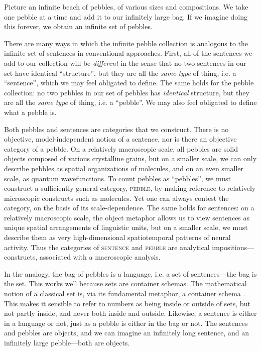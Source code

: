 Picture an infinite beach of pebbles, of various sizes and compositions. We take one pebble at a time and add it to our infinitely large bag. If we imagine doing this forever, we obtain an infinite set of pebbles. 

  There are many ways in which the infinite pebble collection is analogous to the infinite set of sentences in conventional approaches. First, all of the sentences we add to our collection will be \textit{different} in the sense that no two sentences in our set have identical “structure”, but they are all the \textit{same type} of thing, i.e. a “sentence”, which we may feel obligated to define. The same holds for the pebble collection: no two pebbles in our set of pebbles has \textit{identical} structure, but they are all the \textit{same type} of thing, i.e. a “pebble”. We may also feel obligated to define what a pebble is.

  Both pebbles and sentences are categories that we construct. There is no objective, model-independent notion of a sentence, nor is there an objective category of a pebble. On a relatively macroscopic scale, all pebbles are solid objects composed of various crystalline grains, but on a smaller scale, we can only describe pebbles as spatial organizations of molecules, and on an even smaller scale, as quantum wavefunctions. To count pebbles as “pebbles”, we must construct a sufficiently general category, \textsc{pebble}, by making reference to relatively microscopic constructs such as molecules. Yet one can always contest the category, on the basis of its scale-dependence. The same holds for sentences: on a relatively macroscopic scale, the object metaphor allows us to view sentences as unique spatial arrangements of linguistic units, but on a smaller scale, we must describe them as very high-dimensional spatiotemporal patterns of neural activity. Thus the categories of \textsc{sentence} and \textsc{pebble} are analytical impositions—constructs, associated with a macroscopic analysis. 

  In the analogy, the bag of pebbles is a language, i.e. a set of sentences—the bag is the set. This works well because sets are container schemas. The mathematical notion of a classical set is, via its fundamental metaphor, a container schema \citep{LakoffNúñez2000}. This makes it sensible to refer to numbers as being inside or outside of sets, but not partly inside, and never both inside and outside. Likewise, a sentence is either in a language or not, just as a pebble is either in the bag or not. The sentences and pebbles are objects, and we can imagine an infinitely long sentence, and an infinitely large pebble—both are objects. 

